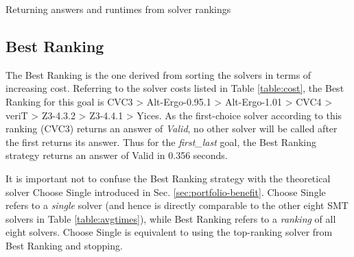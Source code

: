 \begin{algorithm}
	\caption{Returning answers and runtimes from solver rankings}
	\label{algo:rank}
	
\end{algorithm}


\subsection{\textsf{Best Ranking}}
\label{sub:best}

The \textsf{Best Ranking} is the one derived from sorting the solvers in terms of increasing cost. 
Referring to the solver costs listed in Table \ref{table:cost}, the \textsf{Best Ranking} for this goal is
CVC3 > Alt-Ergo-0.95.1 > Alt-Ergo-1.01 > CVC4 > veriT > Z3-4.3.2 > Z3-4.4.1 > Yices. 
As the first-choice solver according to this ranking (CVC3) returns an answer of \textit{Valid}, no other solver will be called after the first returns its answer. 
Thus for the \textit{first\_last} goal, the \textsf{Best Ranking} strategy returns an answer of \textsf{Valid} in 0.356 seconds.   

It is important not to confuse the \textsf{Best Ranking} strategy with the theoretical solver \textsf{Choose Single} introduced in Sec. \ref{sec:portfolio-benefit}. 
\textsf{Choose Single} refers to a \textit{single} solver (and hence is directly comparable to the other eight SMT solvers in Table \ref{table:avgtimes}), while \textsf{Best Ranking} refers to a \textit{ranking} of all eight solvers. \textsf{Choose Single} is equivalent to using the top-ranking solver from \textsf{Best Ranking} and stopping.

